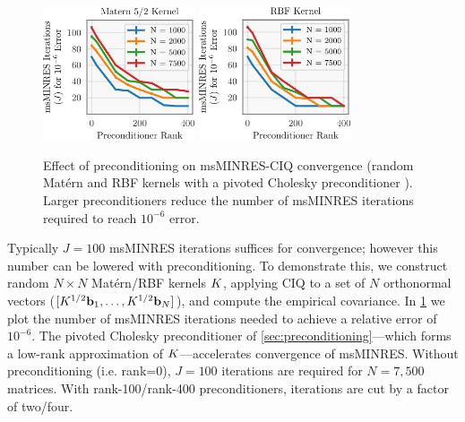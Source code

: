 \begin{figure}[t!]
	\centering
	\includegraphics[width=0.4\textwidth]{figures/precond_result.pdf}
  \quad
	\includegraphics[width=0.4\textwidth]{figures/precond_result_rbf.pdf}
  \caption[
    Effect of preconditioning on msMINRES-CIQ convergence.
  ]{
    Effect of preconditioning on msMINRES-CIQ convergence (random Mat\'ern and RBF kernels with a pivoted Cholesky preconditioner \citep{gardner2018gpytorch}).
    Larger preconditioners reduce the number of msMINRES iterations required to reach $10^{-6}$ error.
  }
  \label{fig:precond_result}
\end{figure}

Typically $J=100$ msMINRES iterations suffices for convergence; however this number can be lowered with preconditioning.
To demonstrate this, we construct  random $N \times N$ Mat\'ern/RBF kernels $K$, applying CIQ to a set of $N$ orthonormal vectors ($[K^{1/2} \mathbf{b}_{1}, \ldots, K^{1/2} \mathbf{b}_{N}]$), and compute the empirical covariance.
In \cref{fig:precond_result} we plot the number of msMINRES iterations needed to achieve a relative error of $10^{-6}$.
The pivoted Cholesky preconditioner of \cref{sec:preconditioning}---which forms a low-rank approximation of $K$---accelerates convergence of msMINRES.
Without preconditioning (i.e. rank=0), $J=100$ iterations are required for $N=7,\!500$ matrices.
With rank-100/rank-400 preconditioners, iterations are cut by a factor of two/four.

